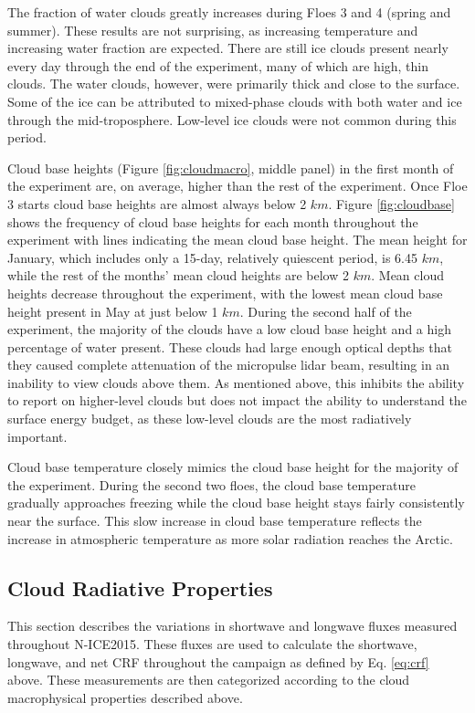 The fraction of water clouds greatly increases during Floes 3 and 4 (spring and summer). These results are not surprising, as increasing temperature and increasing water fraction are expected. There are still ice clouds present nearly every day through the end of the experiment, many of which are high, thin clouds. The water clouds, however, were primarily thick and close to the surface. Some of the ice can be attributed to mixed-phase clouds with both water and ice through the mid-troposphere. Low-level ice clouds were not common during this period.

Cloud base heights (Figure \ref{fig:cloudmacro}, middle panel) in the first month of the experiment are, on average, higher than the rest of the experiment. Once Floe 3 starts cloud base heights are almost always below 2 $km$. Figure \ref{fig:cloudbase} shows the frequency of cloud base heights for each month throughout the experiment with lines indicating the mean cloud base height. The mean height for January, which includes only a 15-day, relatively quiescent period, is 6.45 $km$, while the rest of the months' mean cloud heights are below 2 $km$. Mean cloud heights decrease throughout the experiment, with the lowest mean cloud base height present in May at just below 1 $km$. During the second half of the experiment, the majority of the clouds have a low cloud base height and a high percentage of water present. These clouds had large enough optical depths that they caused complete attenuation of the micropulse lidar beam, resulting in an inability to view clouds above them. As mentioned above, this inhibits the ability to report on higher-level clouds but does not impact the ability to understand the surface energy budget, as these low-level clouds are the most radiatively important.

Cloud base temperature closely mimics the cloud base height for the majority of the experiment. During the second two floes, the cloud base temperature gradually approaches freezing while the cloud base height stays fairly consistently near the surface. This slow increase in cloud base temperature reflects the increase in atmospheric temperature as more solar radiation reaches the Arctic. 

\subsection{Cloud Radiative Properties}
This section describes the variations in shortwave and longwave fluxes measured throughout N-ICE2015. These fluxes are used to calculate the shortwave, longwave, and net CRF throughout the campaign as defined by Eq. \ref{eq:crf} above. These measurements are then categorized according to the cloud macrophysical properties described above.

